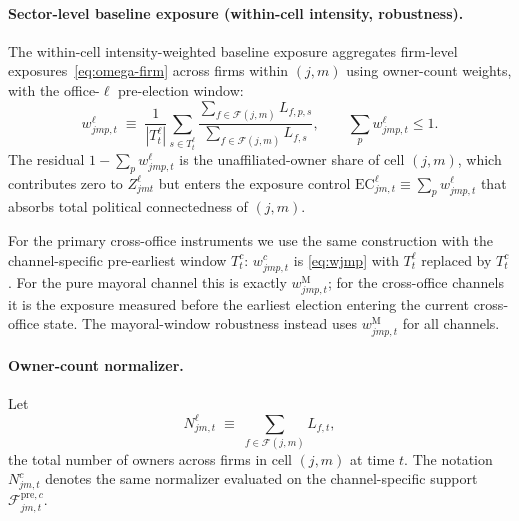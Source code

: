 \documentclass{article}
\newcommand{\EC}{\mathrm{EC}}
\newcommand{\cF}{\mathcal{F}}
\theoremstyle{plain}
\theoremstyle{definition}
\theoremstyle{remark}
\begin{document}
\paragraph{Sector-level baseline exposure (within-cell intensity, robustness).}
The within-cell intensity-weighted baseline exposure aggregates firm-level
exposures~\eqref{eq:omega-firm} across firms within $(j,m)$ using
owner-count weights, with the office-$\ell$ pre-election window:
\begin{equation}\label{eq:wjmp}
  w^{\ell}_{jmp,t}
  \;\equiv\;
  \frac{1}{|T^{\ell}_t|}\sum_{s\in T^{\ell}_t}
    \frac{\sum_{f\in\cF(j,m)} L_{f,p,s}}
         {\sum_{f\in\cF(j,m)} L_{f,s}},
  \qquad
  \sum_{p} w^{\ell}_{jmp,t}\le 1.
\end{equation}
The residual $1-\sum_{p}w^{\ell}_{jmp,t}$ is the unaffiliated-owner
share of cell $(j,m)$, which contributes zero to $Z^{\ell}_{jmt}$ but
enters the exposure control
$\EC^{\ell}_{jm,t}\equiv\sum_p w^{\ell}_{jmp,t}$ that absorbs total
political connectedness of $(j,m)$.

For the primary cross-office instruments we use the same construction
with the channel-specific pre-earliest window $T^c_t$:
$w^c_{jmp,t}$ is \eqref{eq:wjmp} with $T^\ell_t$ replaced by
$T^c_t$. For the pure mayoral channel this is exactly
$w^{\mathrm{M}}_{jmp,t}$; for the cross-office channels it is the
exposure measured before the earliest election entering the current
cross-office state. The mayoral-window robustness instead uses
$w^{\mathrm{M}}_{jmp,t}$ for all channels.

\paragraph{Owner-count normalizer.}
Let
\begin{equation}\label{eq:N-norm}
  N^{\ell}_{jm,t}
  \;\equiv\;
  \sum_{f\in\cF(j,m)} L_{f,t},
\end{equation}
the total number of owners across firms in cell $(j,m)$ at time $t$.
The notation $N^c_{jm,t}$ denotes the same normalizer evaluated on the
channel-specific support $\cF^{\mathrm{pre},c}_{jm,t}$.
\end{document}
